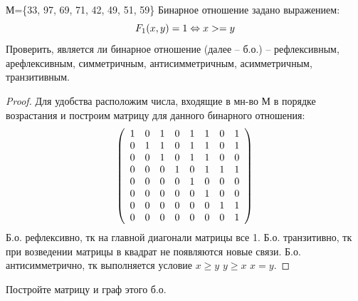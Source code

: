 \begin{problem}
    
    М=\{33, 97, 69, 71, 42, 49, 51, 59\}\newline
	Бинарное отношение задано выражением: \newline
   $$ F_{1}(x,y)=1\Leftrightarrow x>=y\newline$$
 \newline
 Проверить, является ли бинарное отношение (далее -- б.о.) -- рефлексивным, арефлексивным, симметричным, антисимметричным, асимметричным, транзитивным.
\end{problem}

\begin{proof}
    Для удобства расположим числа, входящие в мн-во М в порядке возрастания и построим матрицу для данного бинарного отношения:
	$$ \left( \begin{array}{c c c c c c c c } 
 
 1 & 0 & 1 & 0 & 1 & 1 & 0 & 1 \\ 

 0 & 1 & 1 & 0 & 1 & 1 & 0 & 1 \\

 0 & 0 & 1 & 0 & 1 & 1 & 0 & 0 \\
 
 0 & 0 & 0 & 1 & 0 & 1 & 1 & 1 \\
 
 0 & 0 & 0 & 0 & 1 & 0 & 0 & 0 \\
 
 0 & 0 & 0 & 0 & 0 & 1 & 0 & 0 \\
 
 0 & 0 & 0 & 0 & 0 & 0 & 1 & 1 \\
 
 0 & 0 & 0 & 0 & 0 & 0 & 0 & 1 \end {array} \right) $$
  Б.о. рефлексивно, тк на главной диагонали матрицы все 1.
    \newline
    Б.о. транзитивно, тк при возведении матрицы в квадрат не появляются новые связи.
     \newline
      Б.о. антисимметрично, тк выполняется условие $x \ge y$ \wedge $y \ge x$ \Rightarrow $x = y$.
      \newline
\end{proof}

\begin{problem}
	Постройте матрицу и граф этого б.о.
\end{problem}


